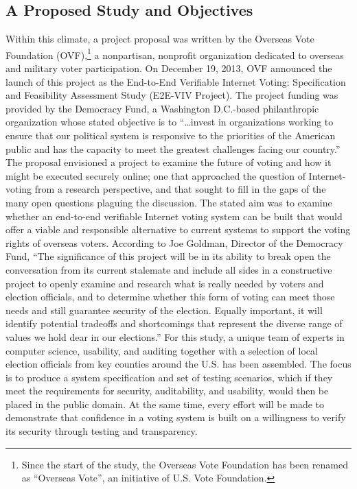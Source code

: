\subsection{A Proposed Study and Objectives}
\label{sec:proposed-study-and-objectives}

Within this climate, a project proposal was written by the Overseas
Vote Foundation (OVF),\footnote{Since the start of the study, the
  Overseas Vote Foundation has been renamed as ``Overseas Vote'', an
  initiative of U.S. Vote Foundation.} a nonpartisan, nonprofit
organization dedicated to overseas and military voter participation.
On December 19, 2013, OVF announced the launch of this project as the
End-to-End Verifiable Internet Voting: Specification and Feasibility
Assessment Study (E2E-VIV Project). The project funding was provided
by the Democracy Fund, a Washington D.C.-based philanthropic
organization whose stated objective is to ``\ldots{}invest in
organizations working to ensure that our political system is
responsive to the priorities of the American public and has the
capacity to meet the greatest challenges facing our country.'' The
proposal envisioned a project to examine the future of voting and how
it might be executed securely online; one that approached the question
of Internet-voting from a research perspective, and that sought to
fill in the gaps of the many open questions plaguing the discussion.
The stated aim was to examine whether an end-to-end verifiable
Internet voting system can be built that would offer a viable and
responsible alternative to current systems to support the voting
rights of overseas voters. According to Joe Goldman, Director of the
Democracy Fund, ``The significance of this project will be in its
ability to break open the conversation from its current stalemate and
include all sides in a constructive project to openly examine and
research what is really needed by voters and election officials, and
to determine whether this form of voting can meet those needs and
still guarantee security of the election. Equally important, it will
identify potential tradeoffs and shortcomings that represent the
diverse range of values we hold dear in our elections.'' For this
study, a unique team of experts in computer science, usability, and
auditing together with a selection of local election officials from
key counties around the U.S. has been assembled. The focus is to
produce a system specification and set of testing scenarios, which if
they meet the requirements for security, auditability, and usability,
would then be placed in the public domain. At the same time, every
effort will be made to demonstrate that confidence in a voting system
is built on a willingness to verify its security through testing and
transparency.

